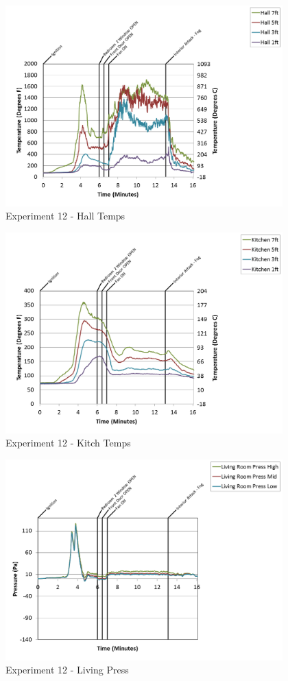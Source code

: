 \documentclass{article}
\begin{document}
\begin{appendices}
\clearpage

\begin{figure}[h!]
	\centering
	\includegraphics[height=3.05in]{0_Images/Results_Charts/Exp_12_Charts/HallTemps.png}
	\caption{Experiment 12 - Hall Temps}
\end{figure}


\begin{figure}[h!]
	\centering
	\includegraphics[height=3.05in]{0_Images/Results_Charts/Exp_12_Charts/KitchTemps.png}
	\caption{Experiment 12 - Kitch Temps}
\end{figure}

\clearpage

\begin{figure}[h!]
	\centering
	\includegraphics[height=3.05in]{0_Images/Results_Charts/Exp_12_Charts/LivingPress.png}
	\caption{Experiment 12 - Living Press}
\end{figure}



\end{appendices}
\end{document}
